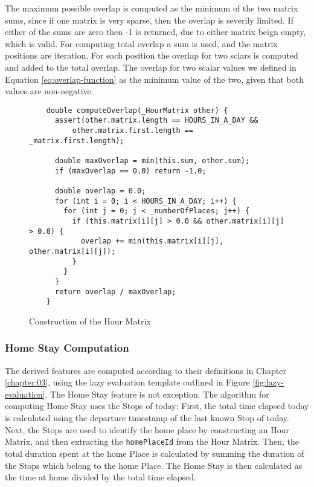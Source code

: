 The maximum possible overlap is computed as the minimum of the two matrix sums, since if one matrix is very sparse, then the overlap is severily limited. If either of the sums are zero then -1 is returned, due to either matrix beign empty, which is valid. For computing total overlap a sum is used, and the matrix positions are iteration. For each position the overlap for two sclars is computed and added to the total overlap. The overlap for two scalar values we defined in Equation \ref{eq:overlap-function} as the minimum value of the two, given that both values are non-negative. 

\begin{figure}
    \centering
    \begin{verbatim}
    double computeOverlap(_HourMatrix other) {
      assert(other.matrix.length == HOURS_IN_A_DAY &&
          other.matrix.first.length == _matrix.first.length);
    
      double maxOverlap = min(this.sum, other.sum);
      if (maxOverlap == 0.0) return -1.0;
    
      double overlap = 0.0;
      for (int i = 0; i < HOURS_IN_A_DAY; i++) {
        for (int j = 0; j < _numberOfPlaces; j++) {
          if (this.matrix[i][j] > 0.0 && other.matrix[i][j] > 0.0) {
            overlap += min(this.matrix[i][j], other.matrix[i][j]);
          }
        }
      }
      return overlap / maxOverlap;
    }
    \end{verbatim}
    \caption{Construction of the Hour Matrix}
    \label{fig:hour-matrix-overlap}
\end{figure}


\subsubsection{Home Stay Computation}
The derived features are computed according to their definitions in Chapter \ref{chapter:03}, using the lazy evaluation template outlined in Figure \ref{fig:lazy-evaluation}. The Home Stay feature is not exception. The algorithm for computing Home Stay uses the Stops of today: First, the total time elapsed today is calculated using the departure timestamp of the last known Stop of today. Next, the Stops are used to identify the home place by constructing an Hour Matrix, and then extracting the \verb|homePlaceId| from the Hour Matrix. Then, the total duration spent at the home Place is calculated by summing the duration of the Stops which belong to the home Place. The Home Stay is then calculated as the time at home divided by the total time elapsed.

